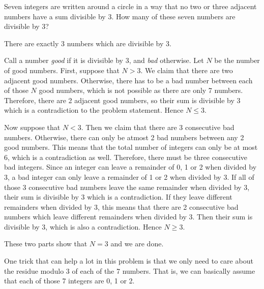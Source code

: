 \begin{question}
    Seven integers are written around a circle in a way that no two or three
    adjacent numbers have a sum divisible by 3. How many of these seven numbers
    are divisible by 3? 
\end{question}
\begin{solution}
    There are exactly 3 numbers which are divisible by 3.

    Call a number \emph{good} if it is divisible by 3, and \emph{bad}
    otherwise. Let $N$ be the number of good numbers. First, suppose that $N >
    3$. We claim that there are two adjacent good numbers. Otherwise, there has
    to be a bad number between each of those $N$ good numbers, which is not
    possible as there are only 7 numbers. Therefore, there are 2 adjacent good
    numbers, so their sum is  divisible by 3 which is a contradiction to the
    problem statement. Hence $N \leq 3$.

    Now suppose that $N < 3$. Then we claim that there are 3 consecutive bad
    numbers. Otherwise, there can only be atmost 2 bad numbers between any 2
    good numbers. This means that the total number of integers can only be at
    most 6, which is a contradiction as well. Therefore, there must be three
    consecutive bad integers. Since an integer can leave a remainder of 0, 1 or
    2 when divided by 3, a bad integer can only leave a remainder of 1 or 2
    when divided by 3. If all of those 3 consecutive bad numbers leave the same
    remainder when divided by 3, their sum is divisible by 3 which is a
    contradiction. If they leave different remainders when divided by 3, this
    means that there are 2 consecutive bad numbers which leave different
    remainders when divided by 3. Then their sum is divisible by 3, which is
    also a contradiction. Hence $N \geq 3$.

    These two parts show that $N = 3$ and we are done.
\end{solution}
\begin{remark}
    One trick that can help a lot in this problem is that we only need to care
    about the residue modulo 3 of each of the 7 numbers. That is, we can
    basically assume that each of those 7 integers are 0, 1 or 2. 
\end{remark}

